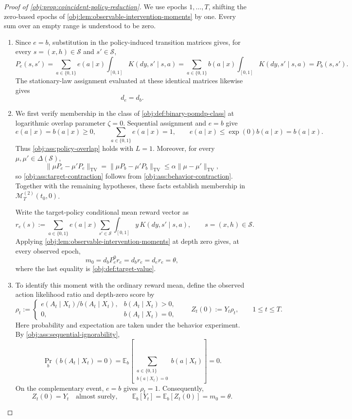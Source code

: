 \begin{proof}[Proof of \cref{obj:prop:coincident-policy-reduction}]
We use epochs \(1,\ldots,T\), shifting the zero-based epochs of \cref{obj:lem:observable-intervention-moments} by one. Every sum over an empty range is understood to be zero.

\begin{enumerate}
\item Since \(e=b\), substitution in the policy-induced transition matrices gives, for every \(s=(x,h)\in\mathcal S\) and \(s'\in\mathcal S\),
\[
P_e(s,s')
=
\sum_{a\in\{0,1\}}e(a\mid x)
   \int_{[0,1]}K(dy,s'\mid s,a)
=
\sum_{a\in\{0,1\}}b(a\mid x)
   \int_{[0,1]}K(dy,s'\mid s,a)
=
P_b(s,s').
\]
The stationary-law assignment evaluated at these identical matrices likewise gives
\[
d_e=d_b.
\]

\item We first verify membership in the class of \cref{obj:def:binary-pomdp-class} at logarithmic overlap parameter \(\zeta=0\). Sequential assignment and \(e=b\) give
\[
e(a\mid x)=b(a\mid x)\geq0,
\qquad
\sum_{a\in\{0,1\}}e(a\mid x)=1,
\qquad
e(a\mid x)\leq \exp(0)b(a\mid x)=b(a\mid x).
\]
Thus \cref{obj:ass:policy-overlap} holds with \(L=1\). Moreover, for every \(\mu,\mu'\in\Delta(\mathcal S)\),
\[
\|\mu P_e-\mu'P_e\|_{\mathrm{TV}}
=
\|\mu P_b-\mu'P_b\|_{\mathrm{TV}}
\leq
\alpha\|\mu-\mu'\|_{\mathrm{TV}},
\]
so \cref{obj:ass:target-contraction} follows from \cref{obj:ass:behavior-contraction}. Together with the remaining hypotheses, these facts establish membership in \(\mathcal M_T^{(2)}(t_0,0)\).

Write the target-policy conditional mean reward vector as
\[
r_e(s):=
\sum_{a\in\{0,1\}}e(a\mid x)
\sum_{s'\in\mathcal S}\int_{[0,1]}y\,K(dy,s'\mid s,a),
\qquad s=(x,h)\in\mathcal S.
\]
Applying \cref{obj:lem:observable-intervention-moments} at depth zero gives, at every observed epoch,
\[
m_0=d_bP_e^0r_e=d_br_e=d_er_e=\theta,
\]
where the last equality is \cref{obj:def:target-value}.

\item To identify this moment with the ordinary reward mean, define the observed action likelihood ratio and depth-zero score by
\[
\rho_t:=
\begin{cases}
e(A_t\mid X_t)/b(A_t\mid X_t),& b(A_t\mid X_t)>0,\\
0,& b(A_t\mid X_t)=0,
\end{cases}
\qquad
Z_t(0):=Y_t\rho_t,
\qquad 1\leq t\leq T.
\]
Here probability and expectation are taken under the behavior experiment. By \cref{obj:ass:sequential-ignorability},
\[
\Pr_b\!\left(b(A_t\mid X_t)=0\right)
=
\mathbb E_b\!\left[
\sum_{\substack{a\in\{0,1\}\\ b(a\mid X_t)=0}}
b(a\mid X_t)
\right]
=0.
\]
On the complementary event, \(e=b\) gives \(\rho_t=1\). Consequently,
\[
Z_t(0)=Y_t\quad\text{almost surely},
\qquad
\mathbb E_b[Y_t]
=
\mathbb E_b[Z_t(0)]
=
m_0
=
\theta.
\]


\end{enumerate}
\end{proof}
